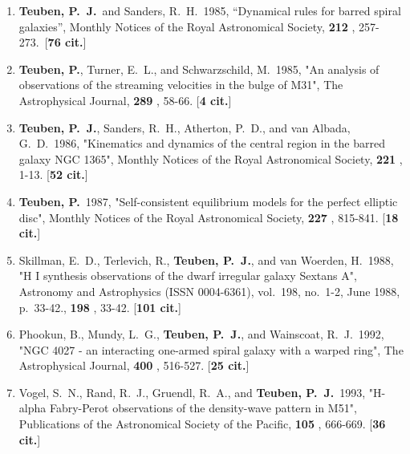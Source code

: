 \documentclass[11pt,letterpaper]{article}
\begin{document}
\setcounter{enumi}{1}   %
\begin{enumerate}[label=\textbf{\arabic*}.]

\item  
{\bf Teuben, P.~J.}~and Sanders, R.~H.\ 1985,  ``Dynamical rules for barred 
spiral galaxies'', Monthly Notices of the Royal Astronomical Society,  {\bf 
212} , 257-273.\  [{\bf 76 cit.}] 
  
\item  
{\bf Teuben, P.}, Turner, E.~L., and Schwarzschild, M.\  1985,  "An analysis of 
observations of the streaming velocities in the bulge of M31", The 
Astrophysical Journal,  {\bf 289} , 58-66.  [{\bf 4 cit.}] 


\item  
{\bf Teuben, P.~J.}, Sanders, R.~H., Atherton, P.~D., and van Albada, G.~D.\  
1986,  "Kinematics and dynamics of the central region in the barred galaxy 
NGC 1365", Monthly Notices of the Royal Astronomical Society,  {\bf 221} , 
1-13.  [{\bf 52 cit.}] 

\item  
{\bf Teuben, P.}\  1987,  "Self-consistent equilibrium models for the perfect 
elliptic disc", Monthly Notices of the Royal Astronomical Society,  {\bf 
227} , 815-841.  [{\bf 18 cit.}] 

\item  
Skillman, E.~D., Terlevich, R., {\bf Teuben, P.~J.}, and van Woerden, H.\  1988,  
"H I synthesis observations of the dwarf irregular galaxy Sextans A", 
Astronomy and Astrophysics (ISSN 0004-6361), vol.~198, no.~1-2, June 1988, 
p.~33-42.,  {\bf 198} , 33-42.  [{\bf 101 cit.}] 

\item  
Phookun, B., Mundy, L.~G., {\bf Teuben, P.~J.}, and Wainscoat, R.~J.\  1992,  
"NGC 4027 - an interacting one-armed spiral galaxy with a warped ring", The 
Astrophysical Journal,  {\bf 400} , 516-527.  [{\bf 25 cit.}] 

\item  
Vogel, S.~N., Rand, R.~J., Gruendl, R.~A., and {\bf Teuben, P.~J.}\  1993,  
"H-alpha Fabry-Perot observations of the density-wave pattern in M51", 
Publications of the Astronomical Society of the Pacific,  {\bf 105} , 
666-669.  [{\bf 36 cit.}] 



\end{enumerate}
\end{document}
